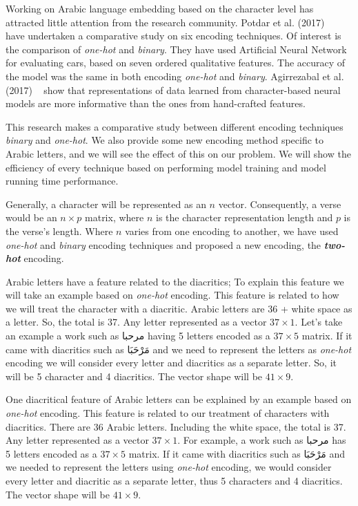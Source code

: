 Working on Arabic language embedding based on the character level has attracted little attention from the research community. Potdar et al. (2017) ~\cite{Potdar_2017} have undertaken a comparative study on six encoding techniques. Of interest is the comparison of \textit{one-hot} and \textit{binary}. They have used Artificial Neural Network for evaluating cars, based on seven ordered qualitative features. The accuracy of the model was the same in both encoding \textit{one-hot} and \textit{binary}. Agirrezabal et al. (2017) ~\cite{Agirrezabal_2017} show that representations of data learned from character-based neural models are more informative than the ones from hand-crafted features.

This research makes a comparative study between different encoding techniques \textit{binary} and \textit{one-hot}. We also provide some new encoding method specific to Arabic letters, and we will see the effect of this on our problem. We will show the efficiency of every technique based on performing model training and model running time performance.

Generally, a character will be represented as an $n$ vector. Consequently, a verse would be an $n \times p$ matrix, where $n$ is the character representation length and $p$ is the verse’s length. Where $n$ varies from one encoding to another, we have used \textit{one-hot} and \textit{binary} encoding techniques and proposed a new encoding, the \textbf{\textit{two-hot}} encoding.

Arabic letters have a feature related to the diacritics; To explain this feature we will take an example based on \textit{\textit{one-hot}} encoding. This feature is related to how we will treat the character with a diacritic. Arabic letters are 36 + white space as a letter. So, the total is 37. Any letter represented as a vector $37 \times 1$. Let's take an example a work such as \textarabic{مرحبا} having 5 letters encoded as a $37 \times 5$ matrix. If it came with diacritics such as \textarabic{مَرْحَبَا} and we need to represent the letters as \textit{one-hot} encoding we will consider every letter and diacritics as a separate letter. So, it will be 5 character and 4 diacritics. The vector shape will be $41 \times 9$.

One diacritical feature of Arabic letters can be explained by an example based on \textit{one-hot} encoding. 
This feature is related to our treatment of characters with diacritics. 
There are 36 Arabic letters. Including the white space, the total is 37. 
Any letter represented as a vector $37 \times 1$. For example, a work such as \textarabic{مرحبا} has 5 letters encoded as a $37 \times 5$ matrix. 
If it came with diacritics such as \textarabic{مَرْحَبَا} and we needed to represent the letters using \textit{one-hot} encoding, we would consider every letter and diacritic as a separate letter, thus 5 characters and 4 diacritics. The vector shape will be $41 \times 9$.

